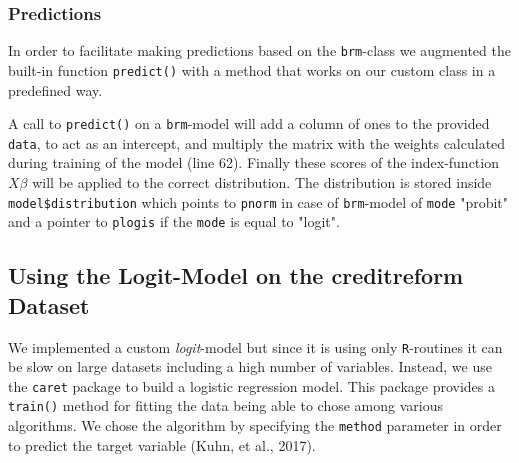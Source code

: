 \documentclass{article}
\begin{document}
\subsubsection{Predictions}

In order to facilitate making predictions based on the \texttt{brm}-class we augmented the built-in function \texttt{predict()} with a method that works on our custom class in a predefined way.



A call to \texttt{predict()} on a \texttt{brm}-model will add a column of ones to the provided \texttt{data}, to act as an intercept, and multiply the matrix with the weights calculated during training of the model (line 62). Finally these scores of the index-function $X\beta$ will be applied to the correct distribution. The distribution is stored inside \texttt{model\$distribution} which points to \texttt{pnorm} in case of \texttt{brm}-model of \texttt{mode} "probit" and a pointer to \texttt{plogis} if the \texttt{mode} is equal to "logit". 

\subsection{Using the Logit-Model on the creditreform Dataset}

We implemented a custom \textit{logit}-model but since it is using only \texttt{R}-routines it can be slow on large datasets including a high number of variables. Instead, we use the \texttt{caret} package to build a logistic regression model. This package provides a \texttt{train()} method for fitting the data being able to chose among various algorithms. We chose the algorithm by specifying the \texttt{method} parameter in order to predict the target variable (Kuhn, et al., 2017).


 
\end{document}
